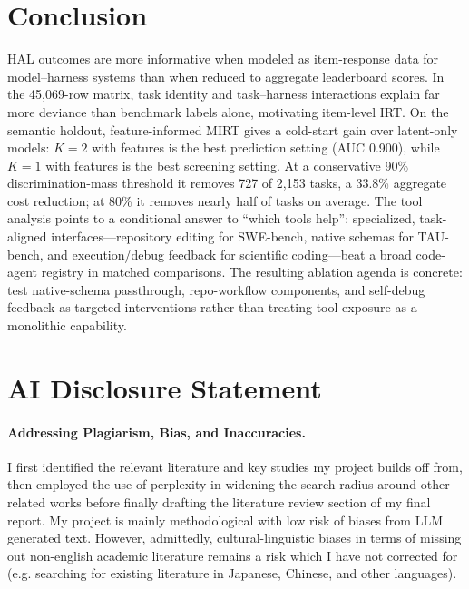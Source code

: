 \documentclass{article}
\begin{document}
\newpage
\section{Conclusion}

HAL outcomes are more informative when modeled as item-response data for model--harness systems than when reduced to aggregate leaderboard scores. In the 45{,}069-row matrix, task identity and task--harness interactions explain far more deviance than benchmark labels alone, motivating item-level IRT. On the semantic holdout, feature-informed MIRT gives a cold-start gain over latent-only models: $K=2$ with features is the best prediction setting (AUC 0.900), while $K=1$ with features is the best screening setting. At a conservative 90\% discrimination-mass threshold it removes 727 of 2{,}153 tasks, a 33.8\% aggregate cost reduction; at 80\% it removes nearly half of tasks on average. The tool analysis points to a conditional answer to ``which tools help'': specialized, task-aligned interfaces---repository editing for SWE-bench, native schemas for TAU-bench, and execution/debug feedback for scientific coding---beat a broad code-agent registry in matched comparisons. The resulting ablation agenda is concrete: test native-schema passthrough, repo-workflow components, and self-debug feedback as targeted interventions rather than treating tool exposure as a monolithic capability.

\section{AI Disclosure Statement}

\paragraph{Addressing Plagiarism, Bias, and Inaccuracies.} I first identified the relevant literature and key studies my project builds off from, then employed the use of perplexity in widening the search radius around other related works before finally drafting the literature review section of my final report. My project is mainly methodological with low risk of biases from LLM generated text. However, admittedly, cultural-linguistic biases in terms of missing out non-english academic literature remains a risk which I have not corrected for (e.g. searching for existing literature in Japanese, Chinese, and other languages).
\end{document}
